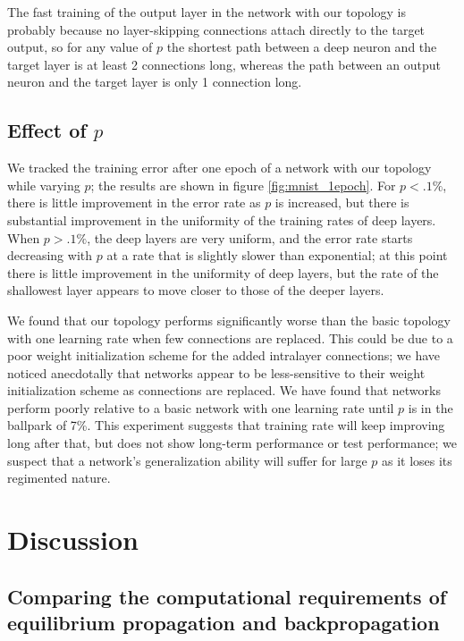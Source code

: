 \documentclass[utf8]{frontiersSCNS}
\begin{document}
The fast training of the output layer in the network with our topology is probably because no layer-skipping connections attach directly to the target output, so for any value of $p$ the shortest path between a deep neuron and the target layer is at least 2 connections long, whereas the path between an output neuron and the target layer is only 1 connection long.

\subsection{Effect of $p$}
\label{sec:mnist_1epoch}

We tracked the training error after one epoch of a network with our topology while varying $p$; the results are shown in figure \ref{fig:mnist_1epoch}. For $p<.1\%$, there is little improvement in the error rate as $p$ is increased, but there is substantial improvement in the uniformity of the training rates of deep layers. When $p>.1\%$, the deep layers are very uniform, and the error rate starts decreasing with $p$ at a rate that is slightly slower than exponential; at this point there is little improvement in the uniformity of deep layers, but the rate of the shallowest layer appears to move closer to those of the deeper layers.

We found that our topology performs significantly worse than the basic topology with one learning rate when few connections are replaced. This could be due to a poor weight initialization scheme for the added intralayer connections; we have noticed anecdotally that networks appear to be less-sensitive to their weight initialization scheme as connections are replaced. We have found that networks perform poorly relative to a basic network with one learning rate until $p$ is in the ballpark of 7\%. This experiment suggests that training rate will keep improving long after that, but does not show long-term performance or test performance; we suspect that a network's generalization ability will suffer for large $p$ as it loses its regimented nature.

\section{Discussion}

\subsection{Comparing the computational requirements of equilibrium propagation and backpropagation}
\label{sec:comparison}
\end{document}
